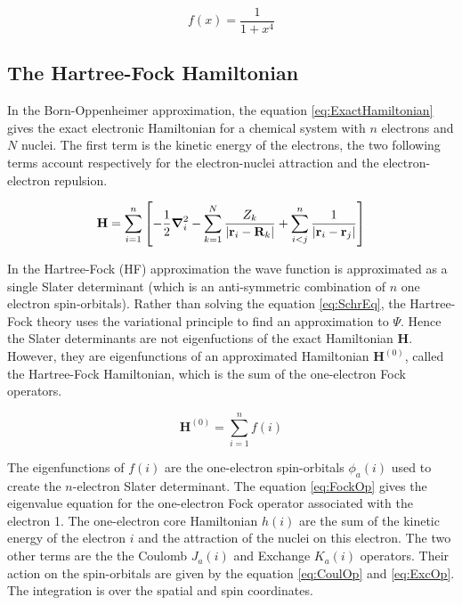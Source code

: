 \documentclass[11pt,a4paper]{article}
\newcommand{\bH}{\mathbf{H}}
\begin{document}
\begin{equation} \label{eq:DivExample}
f(x)=\frac{1}{1+x^4}
\end{equation}

\subsection{The Hartree-Fock Hamiltonian}

In the Born-Oppenheimer approximation, the equation \eqref{eq:ExactHamiltonian} gives the exact electronic Hamiltonian for a chemical system with $n$ electrons and $N$ nuclei. The first term is the kinetic energy of the electrons, the two following terms account respectively for the electron-nuclei attraction and the electron-electron repulsion.

\begin{equation}\label{eq:ExactHamiltonian}
    \bH=\sum\limits_{i=1}^{n}\left[ -\frac{1}{2}\grad_i^2 - \sum\limits_{k=1}^{N} \frac{Z_k}{|\vb{r}_i-\vb{R}_k|}+\sum\limits_{i<j}^{n}\frac{1}{|\vb{r}_i-\vb{r}_j|}\right]
\end{equation}

In the Hartree-Fock (HF) approximation the wave function is approximated as a single Slater determinant (which is an anti-symmetric combination of $n$ one electron spin-orbitals). Rather than solving the equation \eqref{eq:SchrEq}, the Hartree-Fock theory uses the variational principle to find an approximation to $\Psi$. Hence the Slater determinants are not eigenfuctions of the exact Hamiltonian $\bH$. However, they are eigenfunctions of an approximated Hamiltonian $\bH^{(0)}$, called the Hartree-Fock Hamiltonian, which is the sum of the one-electron Fock operators.

\begin{equation}\label{eq:HFHamiltonian}
\bH^{(0)}= \sum\limits_{i=1}^{n} f(i)
\end{equation}

The eigenfunctions of $f(i)$ are the one-electron spin-orbitals $\phi_a(i)$ used to create the $n$-electron Slater determinant. The equation \eqref{eq:FockOp} gives the eigenvalue equation for the one-electron Fock operator associated with the electron 1. The one-electron core Hamiltonian $h(i)$ are the sum of the kinetic energy of the electron $i$ and the attraction of the nuclei on this electron. The two other terms are the the Coulomb $J_a(i)$ and Exchange $K_a(i)$ operators. Their action on the spin-orbitals are given by the equation \eqref{eq:CoulOp} and \eqref{eq:ExcOp}. The integration is over the spatial and spin coordinates.
\end{document}
